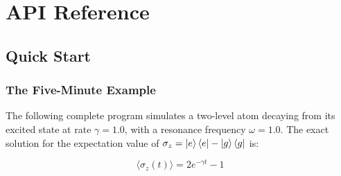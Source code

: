 \documentclass[11pt,a4paper,twoside]{book}
\theoremstyle{definition}
\theoremstyle{remark}
\begin{document}
\part{API Reference}

\chapter{Quick Start}
\label{chap:quickstart}

\section{The Five-Minute Example}
\label{sec:five-minute}

The following complete program simulates a two-level atom decaying
from its excited state at rate $\gamma = 1.0$, with a resonance
frequency $\omega = 1.0$. The exact solution for the expectation value
of $\sigma_z = \ket{e}\bra{e} - \ket{g}\bra{g}$ is:

\begin{equation}
  \langle \sigma_z(t) \rangle = 2 e^{-\gamma t} - 1
  \label{eq:two-level-exact}
\end{equation}
\end{document}

